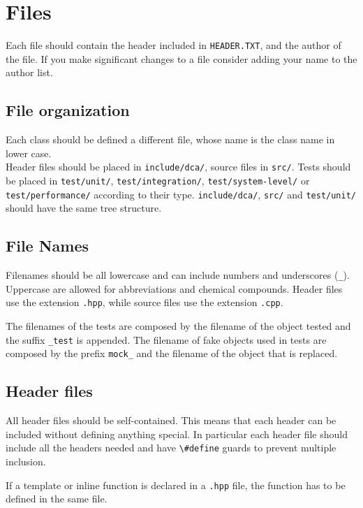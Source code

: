 \documentclass[a4paper]{article}
\newcommand{\inlinecode}[1]{\lstinline|#1|}
\begin{document}
\tableofcontents

\section{Files}
Each file should contain the header included in \inlinecode{HEADER.TXT}, and the author of the file.
If you make significant changes to a file consider adding your name to the author list.\\

\subsection{File organization}
Each class should be defined a different file, whose name is the class name in lower case.\\

Header files should be placed in \verb|include/dca/|, source files in \verb|src/|. Tests should be placed in \verb|test/unit/|, \verb|test/integration/|, \verb|test/system-level/| or \verb|test/performance/| according to their type. \verb|include/dca/|, \verb|src/| and \verb|test/unit/| should have the same tree structure.

\subsection{File Names}
Filenames should be all lowercase and can include numbers and underscores (\inlinecode{_}). Uppercase are allowed for abbreviations and chemical compounds.
Header files use the extension \verb|.hpp|, while source files use the extension \verb|.cpp|.

The filenames of the tests are composed by the filename of the object tested and the suffix \inlinecode{_test} is appended.
The filename of fake objects used in tests are composed by the prefix \inlinecode{mock_} and the filename of the object that is replaced.

\subsection{Header files}
All header files should be self-contained. This means that each header can be included without defining anything special.
In particular each header file should include all the headers needed and have \inlinecode{\#define} guards to prevent multiple inclusion.

If a template or inline function is declared in a \verb|.hpp| file, the function has to be defined in the same file.
\end{document}
